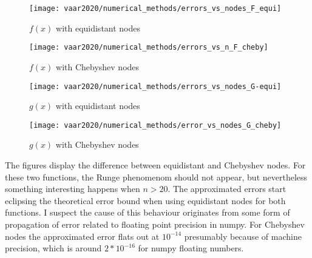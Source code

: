 \begin{figure}[H]
    \centering
    \begin{minipage}{0.45\textwidth}
        \centering
        \texttt{[image: vaar2020/numerical\_methods/errors\_vs\_nodes\_F\_equi]} %
        \caption{$f(x)$ with equidistant nodes}
    \end{minipage}\hfill
    \begin{minipage}{0.45\textwidth}
        \centering
        \texttt{[image: vaar2020/numerical\_methods/errors\_vs\_n\_F\_cheby]} %
        \caption{$f(x)$ with Chebyshev nodes}
    \end{minipage}
\end{figure}
\begin{figure}[H]
    \centering
    \begin{minipage}{0.45\textwidth}
        \centering
        \texttt{[image: vaar2020/numerical\_methods/errors\_vs\_nodes\_G-equi]} %
        \caption{$g(x)$ with equidistant nodes}
    \end{minipage}\hfill
    \begin{minipage}{0.45\textwidth}
        \centering
        \texttt{[image: vaar2020/numerical\_methods/error\_vs\_nodes\_G\_cheby]} %
        \caption{$g(x)$ with Chebyshev nodes}
    \end{minipage}
\end{figure}
The figures display the difference between equidistant and Chebyshev nodes. For these two functions, the Runge phenomenom should not appear, but nevertheless something interesting happens when $n>20$. The approximated errors start eclipsing the theoretical error bound when using equidistant nodes for both functions. I suspect the cause of this behaviour originates from some form of propagation of error related to floating point precision in numpy. For Chebyshev nodes the approximated error flats out at $10^{-14}$ presumably because of machine precision, which is around $2*10^{-16}$ for numpy floating numbers.

